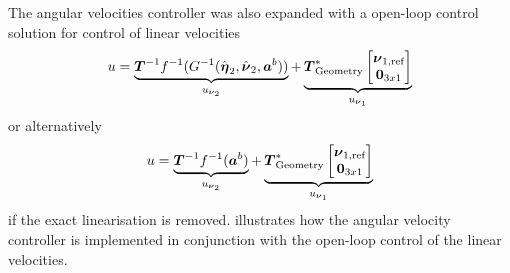The angular velocities \abbrPI controller was also expanded with a open-loop control solution for control of linear velocities
\begin{equation}
	u = \underbrace{\boldsymbol{T}^{-1}f^{-1}(G^{-1}(\hat{\etaVector}_2,\hat{\nuVector}_2,\accVector^b))}_{u_{\nuVectorAng}} + \underbrace{\thrusterGeometryOnes[*] \begin{bmatrix}\nuVector_{1,\text{ref}} \\ \zeroCol{3} \end{bmatrix}}_{u_{\nuVectorLin}}	
\end{equation}
or alternatively 
\begin{equation}
	u = \underbrace{\boldsymbol{T}^{-1}f^{-1}(\accVector^b)}_{u_{\nuVectorAng}} + \underbrace{\thrusterGeometryOnes[*] \begin{bmatrix} \nuVector_{1,\text{ref}} \\ \zeroCol{3} \end{bmatrix}}_{u_{\nuVectorLin}}
\end{equation}
if the exact linearisation is removed.  illustrates how the angular velocity controller is implemented in conjunction with the open-loop control of the linear velocities.
